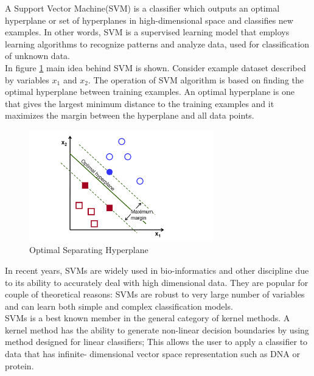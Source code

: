 A Support Vector Machine(SVM) is a classifier which outputs an optimal hyperplane or set of hyperplanes in high-dimensional space and classifies new examples. In other words, SVM is a supervised learning model that employs learning algorithms to recognize patterns and analyze data, used for classification of unknown data\cite{wiki:SVM}.\\
In figure \ref{fig:SVM} main idea behind SVM is shown. Consider example dataset described by variables $x_1$ and $x_2$. The operation of SVM algorithm is based on finding the optimal hyperplane between training examples. An optimal hyperplane is one that gives the largest minimum distance to the training examples and it maximizes the margin between the hyperplane and all data points\cite{opencv_library}.

\begin{figure}[H]
    \includegraphics[width=80mm]{./img/SVM.png}
     \caption{Optimal Separating Hyperplane}
    \label{fig:SVM}
\end{figure}

In recent years, SVMs are widely used in bio-informatics \cite{furey2000support,osuna1997training,guyon2002gene} and other discipline due to its ability to accurately deal with high dimensional data\cite{joachims1998text}. They are popular for couple of theoretical reasons: SVMs are robust to very large number of variables and can learn both simple and complex classification models\cite{cristianini2000}.\\

SVMs is a best known member in the general category of kernel methods\cite{shawe2004kernel}. A kernel method has the ability to generate non-linear decision boundaries by using method designed for linear classifiers; This allows the user to apply a classifier to data that has infinite- dimensional vector space representation such as DNA or protein\cite{ben2010user}.    




